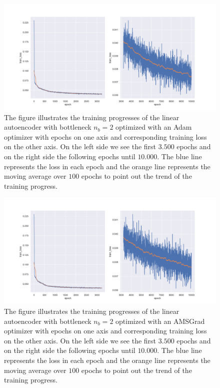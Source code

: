 \begin{figure}
\begin{center}
\includegraphics[width=\linewidth]{linear_AE_2d_adam_training_progress}
\end{center}
\caption{The figure illustrates the training progresses of the linear autoencoder with bottleneck $n_b=2$ optimized with an Adam optimizer with epochs on one axis and corresponding training loss on the other axis. On the left side we see the first $3.500$ epochs and on the right side the following epochs until $10.000$. The blue line represents the loss in each epoch and the orange line represents the moving average over $100$ epochs to point out the trend of the training progress.}\label{fig:linear_AE_2d_adam_training_progress}
\end{figure}


\begin{figure}
\begin{center}
\includegraphics[width=\linewidth]{linear_AE_2d_amsgrad_training_progress}
\end{center}
\caption{The figure illustrates the training progresses of the linear autoencoder with bottleneck $n_b=2$ optimized with an AMSGrad optimizer with epochs on one axis and corresponding training loss on the other axis. On the left side we see the first $3.500$ epochs and on the right side the following epochs until $10.000$. The blue line represents the loss in each epoch and the orange line represents the moving average over $100$ epochs to point out the trend of the training progress.}\label{fig:linear_AE_2d_amsgrad_training_progress}
\end{figure}


